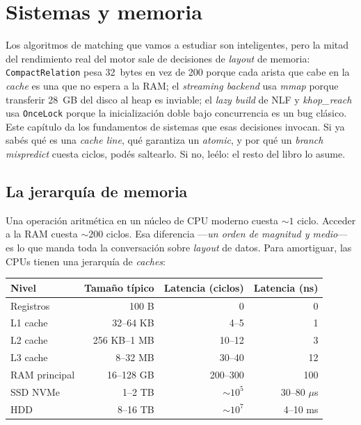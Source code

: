 \chapter{Sistemas y memoria}
\label{cap:sistemas}

\begin{intuicion}
Los algoritmos de matching que vamos a estudiar son inteligentes,
pero la mitad del rendimiento real del motor sale de decisiones de
\emph{layout} de memoria: \texttt{CompactRelation} pesa 32~bytes en
vez de 200 porque cada arista que cabe en la \emph{cache} es una que
no espera a la RAM; el \emph{streaming backend} usa \emph{mmap}
porque transferir 28~GB del disco al heap es inviable; el \emph{lazy
build} de NLF y \emph{khop\_reach} usa \texttt{OnceLock} porque la
inicialización doble bajo concurrencia es un bug clásico. Este
capítulo da los fundamentos de sistemas que esas decisiones invocan.
Si ya sabés qué es una \emph{cache line}, qué garantiza un
\emph{atomic}, y por qué un \emph{branch mispredict} cuesta ciclos,
podés saltearlo. Si no, leélo: el resto del libro lo asume.
\end{intuicion}

\section{La jerarquía de memoria}

Una operación aritmética en un núcleo de CPU moderno cuesta
\(\sim 1\) ciclo. Acceder a la RAM cuesta \(\sim 200\) ciclos. Esa
diferencia ---\emph{un orden de magnitud y medio}--- es lo que
manda toda la conversación sobre \emph{layout} de datos. Para
amortiguar, las CPUs tienen una jerarquía de \emph{caches}:

\begin{center}
\renewcommand{\arraystretch}{1.3}
\begin{tabular}{lrrr}
\toprule
\textbf{Nivel} & \textbf{Tamaño típico} & \textbf{Latencia (ciclos)} & \textbf{Latencia (ns)} \\
\midrule
Registros        & 100 B             & 0           & 0 \\
L1 cache         & 32--64 KB         & 4--5        & 1 \\
L2 cache         & 256 KB--1 MB      & 10--12      & 3 \\
L3 cache         & 8--32 MB          & 30--40      & 12 \\
RAM principal    & 16--128 GB        & 200--300    & 100 \\
SSD NVMe         & 1--2 TB           & \(\sim 10^5\) & 30--80 \(\mu\)s \\
HDD              & 8--16 TB          & \(\sim 10^7\) & 4--10 ms \\
\bottomrule
\end{tabular}
\end{center}

